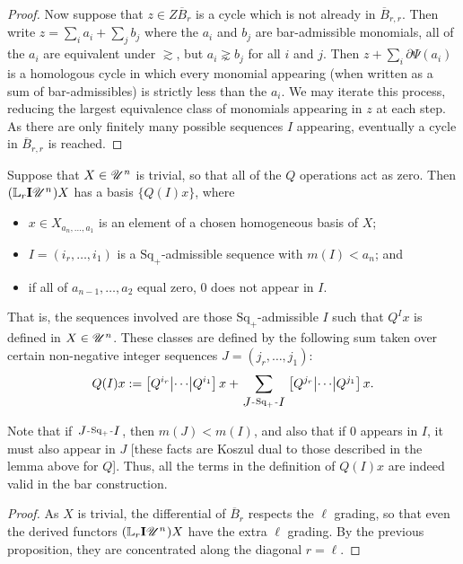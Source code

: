 \documentclass[11pt]{article}
\makeatletter
\newcommand{\nontop}[1]{\scrU^{#1}}%
\newcommand{\produces}[3]{{#1}{#3}{#2}}
\newcommand{\Ind}[2][]{\mathbf{I}{#2}_{#1}}%
\newcommand{\derived}{\mathbb{L}}
\renewcommand{\Q}{Q}
\newcommand{\SqShift}{\Sq_{+}}
\newcommand{\Sq}{\mathrm{Sq}}
\newcommand{\minDim}{m}
\renewcommand{\produces}[3]{
{
\def\labelstyle{\scriptstyle}
\xymatrix@C=2em@1{
{#1}
\ar@{-}[r]|-{{\,#3\,}}
&%
{#2}%
}}}
\makeatother
\begin{document}
\begin{KoszulComplexes2plus}
\begin{proof}
Now suppose that $z\in Z\overline{B}_r$ is a cycle which is not already in $\overline{B}_{r,r}$. Then write 
$z=\sum_i a_i + \sum_j b_j$ where the $a_i$ and $b_j$ are bar-admissible monomials, all of the $a_i$ are equivalent under $\gtrsim$, but $a_i\gnsim b_j$ for all $i$ and $j$. Then $z+\sum_i\partial\Psi(a_i)$ is a homologous cycle in which every monomial appearing (when written as a sum of bar-admissibles) is strictly less than the $a_i$. We may iterate this process, reducing the largest equivalence class of monomials appearing in $z$ at each step. As there are only finitely many possible sequences $I$ appearing, eventually a cycle in $\overline{B}_{r,r}$ is reached.
\end{proof}

\begin{prop*}
Suppose that $X\in\nontop{n}$ is trivial, so that all of the $\Q$ operations act as zero. Then %
$(\derived_r\Ind{\nontop{n}})X$ has a basis $\{\Q(I)x\}$, where
\begin{itemize}
\setlength{\parindent}{.25in}
\item $x\in X_{a_n,\ldots,a_1}$ is an element of a chosen homogeneous basis of $X$;
\item $I=(i_r,\ldots,i_1)$ is a $\SqShift$-admissible sequence with $\minDim(I)<a_n$; and
\item if all of $a_{n-1},\ldots,a_2$ equal zero, $0$ does not appear in $I$.
\end{itemize}
That is, the sequences involved are those $\SqShift$-admissible $I$ such that $Q^Ix$ is defined in $X\in\nontop{n}$.
These classes are defined by the following sum taken over certain non-negative integer sequences $J=(j_{r},\ldots,j_1)$:
\[\Q(I)x:=\left[\Q^{i_r}\middle|\cdots\middle|\Q^{i_1} \right]x+\sum_{\produces{J}{I}{\SqShift}}\left[\Q^{j_r} \middle|\cdots\middle|\Q^{j_1} \right]x.\]%
\end{prop*}
\noindent Note that if $\produces{J}{I}{\SqShift}$, then $\minDim(J)<\minDim(I)$, and also that if $0$ appears in $I$, it must also appear in $J$ [these facts are Koszul dual to those described in the lemma above for $\Q$]. Thus, all the terms in the definition of $\Q(I)x$ are indeed valid in the bar construction.
\begin{proof}
As $X$ is trivial, the differential of $\overline{B}_r$ respects the $\ell$ grading, so that even the derived functors $(\derived_r\Ind{\nontop{n}})X$ have the extra $\ell$ grading. By the previous proposition, they are concentrated along the diagonal $r=\ell$.


\end{proof}
\end{KoszulComplexes2plus}
\end{document}
